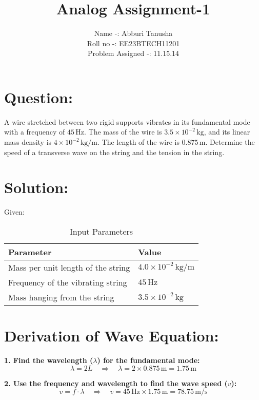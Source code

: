 \documentclass[journal,12pt,twocolumn]{IEEEtran}
\title{Analog Assignment-1}
\author{Name -: Abburi Tanusha\\ Roll no -: EE23BTECH11201\\ Problem Assigned -: 11.15.14}
\begin{document}
\maketitle

\section*{Question:}
A wire stretched between two rigid supports vibrates in its fundamental mode with a frequency of $45 \, \text{Hz}$. The mass of the wire is $3.5 \times 10^{-2} \, \text{kg}$, and its linear mass density is $4 \times 10^{-2} \, \text{kg/m}$. The length of the wire is $0.875 \, \text{m}$. Determine the speed of a transverse wave on the string and the tension in the string.

\section*{Solution:}
Given:
\begin{table}[htb]
\centering
\caption{Input Parameters}
\begin{tabular}{|l|l|}
\hline
\textbf{Parameter} & \textbf{Value} \\
\hline
Mass per unit length of the string & $4.0 \times 10^{-2} \, \text{kg/m}$ \\
\hline
Frequency of the vibrating string & $45 \, \text{Hz}$ \\
\hline
Mass hanging from the string & $3.5 \times 10^{-2} \, \text{kg}$ \\
\hline
\end{tabular}
\end{table}
\section*{Derivation of Wave Equation:}


\textbf{1. Find the wavelength (\(\lambda\)) for the fundamental mode:}
\begin{equation}\label{eq:wavelength}
    \lambda = 2L \quad \Rightarrow \quad \lambda = 2 \times 0.875 \, \text{m} = 1.75 \, \text{m}
\end{equation}

\textbf{2. Use the frequency and wavelength to find the wave speed (\(v\)):}
\begin{equation}\label{eq:wavespeed}
    v = f \cdot \lambda \quad \Rightarrow \quad v = 45 \, \text{Hz} \times 1.75 \, \text{m} = 78.75 \, \text{m/s}
\end{equation}
\end{document}
